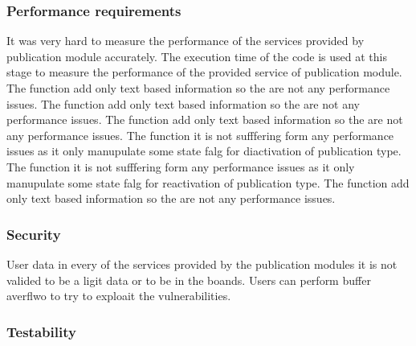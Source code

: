 \subsubsection{Performance requirements}
It was very hard to measure the performance of the services provided by publication module accurately. The execution time of the code is used at this stage to measure the performance of the provided service of publication module.
 The function add only text based information so the are not any performance issues.
 The function add only text based information so the are not any performance issues.
 The function add only text based information so the are not any performance issues.
 The function it is not sufffering form any performance issues as it only manupulate some state falg for diactivation of publication type.
 The function it is not sufffering form any performance issues as it only manupulate some state falg for reactivation of publication type.
 The function add only text based information so the are not any performance issues.

\subsubsection{Security}
User data in every of the services provided by the publication modules it is not valided to be a ligit data or to be in the boands. Users can perform buffer averflwo to try to exploait the vulnerabilities.

\subsubsection{Testability}
